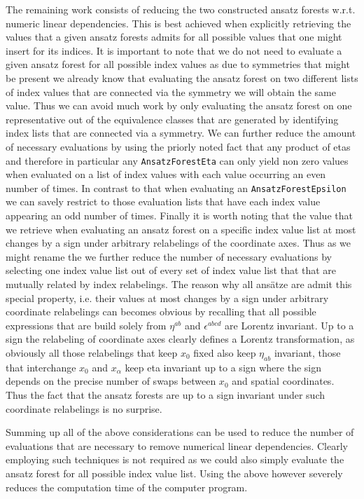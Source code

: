 \documentclass[a4paper,12pt, DIV=14, BCOR=5mm, twoside, headsepline]{scrbook}
\begin{document}
The remaining work consists of reducing the two constructed ansatz forests w.r.t. numeric linear dependencies. This is best achieved when explicitly retrieving the values that a given ansatz forests admits for all possible values that one might insert for its indices. It is important to note that we do not need to evaluate a given ansatz forest for all possible index values as due to symmetries that might be present we already know that evaluating the ansatz forest on two different lists of index values that are connected via the symmetry we will obtain the same value. Thus we can avoid much work by only evaluating the ansatz forest on one representative out of the equivalence classes that are generated by identifying index lists that are connected via a symmetry. We can further reduce the amount of necessary evaluations by using the priorly noted fact that any product of etas and therefore in particular any \texttt{AnsatzForestEta} can only yield non zero values when evaluated on a list of index values with each value occurring an even number of times. In contrast to that when evaluating an \texttt{AnsatzForestEpsilon} we can savely restrict to those evaluation lists that have each index value appearing an odd number of times. Finally it is worth noting that the value that we retrieve when evaluating an ansatz forest on a specific index value list at most changes by a sign under arbitrary relabelings of the coordinate axes. Thus as we might rename the we further reduce the number of necessary evaluations by selecting one index value list out of every set of index value list that that are mutually related by index relabelings. The reason why all ansätze are admit this special property, i.e. their values at most changes by a sign under arbitrary coordinate relabelings can becomes obvious by recalling that all possible expressions that are build solely from $\eta^{ab}$ and $\epsilon^{abcd}$ are Lorentz invariant. Up to a sign the relabeling of coordinate axes clearly defines a Lorentz transformation, as obviously all those relabelings that keep $x_0$ fixed also keep $\eta_{ab}$ invariant, those that interchange $x_0$ and $x_{\alpha}$ keep eta invariant up to a sign where the sign depends on the precise number of swaps between $x_0$ and spatial coordinates. Thus the fact that the ansatz forests are up to a sign invariant under such coordinate relabelings is no surprise. 

Summing up all of the above considerations can be used to reduce the number of evaluations that are necessary to remove numerical linear dependencies. Clearly employing such techniques is not required as we could also simply evaluate the ansatz forest for all possible index value list. Using the above however severely reduces the computation time of the computer program. 
\end{document}
